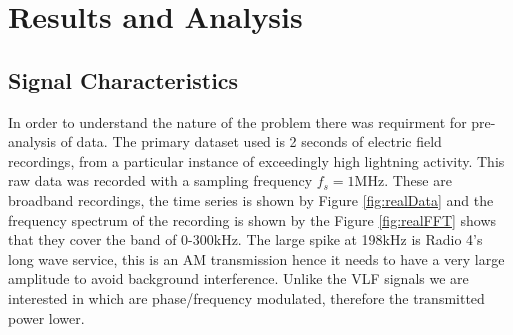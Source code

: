 \chapter{Results and Analysis}
\section{Signal Characteristics}
In order to understand the nature of the problem there was requirment for pre-analysis of data. The primary dataset used is 2 seconds of electric field recordings, from a particular instance of exceedingly high lightning activity. This raw data was recorded with a sampling frequency $f_s = 1\si{\mega\hertz}$. These are broadband recordings, the time series is shown by Figure \ref{fig:realData} and the frequency spectrum of the recording is shown by the Figure \ref{fig:realFFT} shows that they cover the band of 0-300\si{\kilo\hertz}. The large spike at 198kHz is Radio 4's long wave service, this is an AM transmission hence it needs to have a very large amplitude to avoid background interference. Unlike the VLF signals we are interested in which are phase/frequency modulated, therefore the transmitted power lower.


